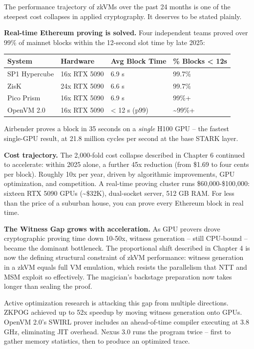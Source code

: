\documentclass[
  11pt,
  openany]{report}
\renewcommand{\textbf}[1]{{\bfseries\color{MidnightBold}#1}}
\begin{document}
The performance trajectory of zkVMs over the past 24 months is one of the
steepest cost collapses in applied cryptography. It deserves to be stated
plainly.

\textbf{Real-time Ethereum proving is solved.} Four independent teams proved
over 99\% of mainnet blocks within the 12-second slot time by late 2025:

\begin{longtable}[]{@{}llll@{}}
\toprule\noalign{}
System & Hardware & Avg Block Time & \% Blocks \textless{} 12s \\
\midrule\noalign{}
\arrayrulecolor{MidnightBlue}\midrule\arrayrulecolor{MidnightBorder}
\endhead
\bottomrule\noalign{}
\endlastfoot
SP1 Hypercube & 16x RTX 5090 & 6.9 s & 99.7\% \\
ZisK & 24x RTX 5090 & 6.6 s & 99.7\% \\
Pico Prism & 16x RTX 5090 & 6.9 s & 99\%+ \\
OpenVM 2.0 & 16x RTX 5090 & \textless{} 12 s (p99) & \textasciitilde99\%+ \\
\end{longtable}

Airbender proves a block in 35 seconds on a \emph{single} H100 GPU -- the
fastest single-GPU result, at 21.8 million cycles per second at the base STARK
layer.

\textbf{Cost trajectory.} The 2,000-fold cost collapse described in Chapter 6
continued to accelerate: within 2025 alone, a further 45x reduction (from \$1.69
to four cents per block). Roughly 10x per year, driven by algorithmic
improvements, GPU optimization, and competition. A real-time proving cluster
runs \$60,000-\$100,000: sixteen RTX 5090 GPUs (\textasciitilde\$32K),
dual-socket server, 512 GB RAM. For less than the price of a suburban house, you
can prove every Ethereum block in real time.

\textbf{The Witness Gap grows with acceleration.} As GPU provers drove
cryptographic proving time down 10-50x, witness generation -- still CPU-bound --
became the dominant bottleneck. The proportional shift described in Chapter 4 is
now the defining structural constraint of zkVM performance: witness generation
in a zkVM equals full VM emulation, which resists the parallelism that NTT and
MSM exploit so effectively. The magician's backstage preparation now takes
longer than sealing the proof.

Active optimization research is attacking this gap from multiple directions.
ZKPOG achieved up to 52x speedup by moving witness generation onto GPUs. OpenVM
2.0's SWIRL prover includes an ahead-of-time compiler executing at 3.8 GHz,
eliminating JIT overhead. Nexus 3.0 runs the program twice -- first to gather
memory statistics, then to produce an optimized trace.
\end{document}
